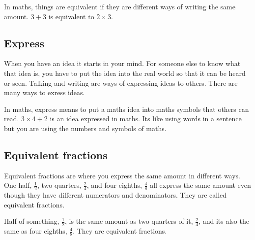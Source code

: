 \documentclass[16pt]{article}
\begin{document}
\begin{spacing}{1.25}
In maths, things are equivalent if they are different ways of writing the same amount. $3+3$ is equivalent to $2 \times 3$.\\

\subsection*{Express} When you have an idea it starts in your mind. For someone else to know what that idea is, you have to put the idea into the real world so that it can be heard or seen. Talking and writing are ways of expressing ideas to others. There are many ways to exress ideas.

In maths, express means to put a maths idea into maths symbols that others can read. $3 \times 4 + 2$ is an idea expressed in maths. Its like using words in a sentence but you are using the numbers and symbols of maths.

\pagebreak

\subsection*{Equivalent fractions}
Equivalent fractions are where you express the same amount in different ways. One half, $\frac{1}{2}$, two quarters, $\frac{2}{4}$, and four eighths, $\frac{4}{8}$ all express the same amount even though they have different numerators and denominators. They are called equivalent fractions.\\


\vspace{28pt}
Half of something, $\frac{1}{2}$, is the same amount as two quarters of it, $\frac{2}{4}$, and its also the same as four eighths, $\frac{4}{8}$. They are equivalent fractions.


\end{spacing}
\end{document}
